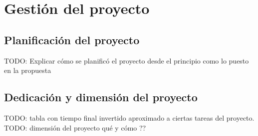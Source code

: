\chapter{Gestión del proyecto}

\section{Planificación del proyecto}


TODO: Explicar cómo se planificó el proyecto desde el principio como lo puesto en la propuesta \\

\section{Dedicación y dimensión del proyecto}



TODO: tabla con tiempo final invertido aproximado a ciertas tareas del proyecto. \\

TODO: dimensión del proyecto qué y cómo ??